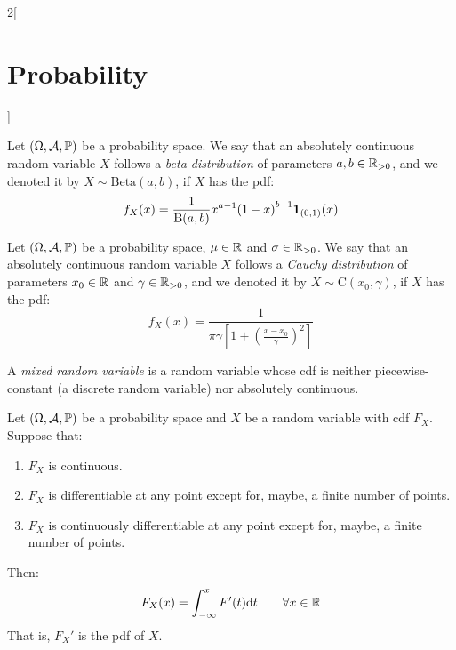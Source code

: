 \documentclass[../../../main.tex]{subfiles}
\begin{document}
\begin{multicols}{2}[\section{Probability}]
\begin{definition}
        Let $(\Omega,\mathcal{A},\mathbb{P})$ be a probability space. We say that an absolutely continuous random variable $X$ follows a \textit{beta distribution} of parameters $a,b\in\mathbb{R}_{>0}$, and we denoted it by $X\sim \text{Beta}(a,b)$, if $X$ has the pdf: $$f_X(x)=\frac{1}{\text{B}(a,b)}x^{a-1}{(1-x)}^{b-1}\boldsymbol{\mathrm{1}}_{(0,1)}(x)$$
    \end{definition}
    \begin{definition}
        Let $(\Omega,\mathcal{A},\mathbb{P})$ be a probability space, $\mu\in\mathbb{R}$ and $\sigma\in\mathbb{R}_{>0}$. We say that an absolutely continuous random variable $X$ follows a \textit{Cauchy distribution} of parameters $x_0\in\mathbb{R}$ and $\gamma\in\mathbb{R}_{>0}$, and we denoted it by $X\sim \text{C}(x_0,\gamma)$, if $X$ has the pdf: $$f_X(x)=\frac{1}{\pi\gamma\left[1+{\left(\frac{x-x_0}{\gamma}\right)}^2\right]}$$
    \end{definition}
    \begin{definition}
        A \textit{mixed random variable} is a random variable whose cdf is neither piecewise-constant (a discrete random variable) nor absolutely  continuous.
    \end{definition}
    \begin{theorem}
        Let $(\Omega,\mathcal{A},\mathbb{P})$ be a probability space and $X$ be a random variable with cdf $F_X$. Suppose that:
        \begin{enumerate}
            \item $F_X$ is continuous.
            \item $F_X$ is differentiable at any point except for, maybe, a finite number of points.
            \item $F_X$ is continuously differentiable at any point except for, maybe, a finite number of points.
        \end{enumerate}
        Then: $$F_X(x)=\int_{-\infty}^xF'(t)\dd t\qquad\forall x\in\mathbb{R}$$
        That is, ${F_X}'$ is the pdf of $X$.
    \end{theorem}

\end{multicols}
\end{document}
